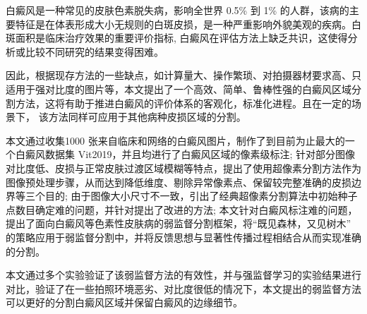 \begin{cabstract}
      白癜风是一种常见的皮肤色素脱失病，影响全世界 0.5\% 到 1\% 的人群，该病的主要特征是在体表形成大小无规则的白斑皮损，是一种严重影响外貌美观的疾病。白斑面积是临床治疗效果的重要评价指标, 白癜风在评估方法上缺乏共识，这使得分析或比较不同研究的结果变得困难。
    
    因此，根据现存方法的一些缺点，如计算量大、操作繁琐、对拍摄器材要求高、只适用于强对比度的图片等，本文提出了一个高效、简单、鲁棒性强的白癜风区域分割方法，这将有助于推进白癜风的评价体系的客观化，标准化进程。且在一定的场景下， 该方法同样可应用于其他病种皮损区域的分割。
   
     本文通过收集1000 张来自临床和网络的白癜风图片，制作了到目前为止最大的一个白癜风数据集 Vit2019，并且均进行了白癜风区域的像素级标注; 针对部分图像对比度低、皮损与正常皮肤过渡区域模糊等特点，提出了使用超像素分割方法作为图像预处理步骤，从而达到降低维度、剔除异常像素点、保留较完整准确的皮损边界等三个目的; 由于图像大小尺寸不一致，引出了经典超像素分割算法中初始种子点数目确定难的问题，并针对提出了改进的方法; 本文针对白癜风标注难的问题，提出了面向白癜风等色素性皮肤病的弱监督分割框架，将“既见森林，又见树木” 的策略应用于弱监督分割中，并将反馈思想与显著性传播过程相结合从而实现准确的分割。

    本文通过多个实验验证了该弱监督方法的有效性，并与强监督学习的实验结果进行对比，验证了在一些拍照环境恶劣、对比度很低的情况下，本文提出的弱监督方法可以更好的分割白癜风区域并保留白癜风的边缘细节。

\end{cabstract}


